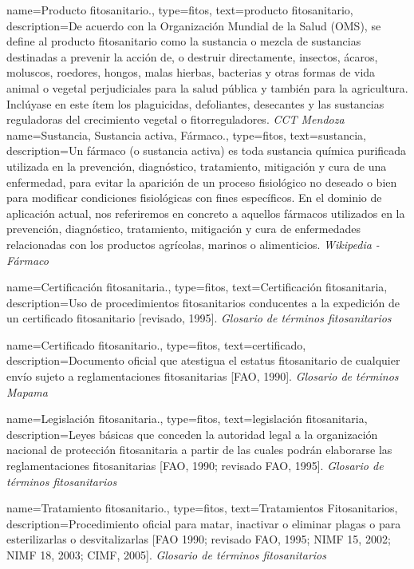 {
    name={Producto fitosanitario.},
  	type=fitos,
    text={producto fitosanitario},
    description={De acuerdo con la Organización Mundial de la Salud (OMS), se define al producto fitosanitario como la \gls{sustancia} o mezcla de sustancias destinadas a prevenir la acción de, o destruir directamente, insectos, ácaros, moluscos, roedores, hongos, malas hierbas, bacterias y otras formas de vida animal o vegetal perjudiciales para la salud pública y también para la agricultura. Inclúyase en este ítem los plaguicidas, defoliantes, desecantes y las sustancias reguladoras del crecimiento vegetal o fitorreguladores. \textit{CCT Mendoza} \cite{cricyt}}
}
{
    name={Sustancia, Sustancia activa, Fármaco.},
  	type=fitos,
    text={sustancia},
    description={Un fármaco (o sustancia activa) es toda sustancia química purificada utilizada en la prevención, diagnóstico, tratamiento, mitigación y cura de una enfermedad, para evitar la aparición de un proceso fisiológico no deseado o bien para modificar condiciones fisiológicas con fines específicos. En el dominio de aplicación actual, nos referiremos en concreto a aquellos fármacos utilizados en la prevención, diagnóstico, tratamiento, mitigación y cura de enfermedades relacionadas con los productos agrícolas, marinos o alimenticios. \textit{Wikipedia - Fármaco} \cite{farmacowiki}}
}

{
    name={Certificación fitosanitaria.},
  	type=fitos,
    text={Certificación fitosanitaria},
    description={Uso de procedimientos fitosanitarios conducentes a la expedición de un certificado fitosanitario [revisado, 1995]. \textit{Glosario de términos fitosanitarios} \cite{glosarioterminosfito}}
}

{
    name={Certificado fitosanitario.},
  	type=fitos,
    text={certificado},
    description={Documento oficial que atestigua el estatus fitosanitario de cualquier envío sujeto a reglamentaciones fitosanitarias [FAO, 1990]. \textit{Glosario de términos Mapama} \cite{glosarioterminosmapama}}
}

{
    name={Legislación fitosanitaria.},
  	type=fitos,
    text={legislación fitosanitaria},
    description={Leyes básicas que conceden la autoridad legal a la organización nacional de protección fitosanitaria a partir de las cuales podrán elaborarse las reglamentaciones fitosanitarias [FAO, 1990; revisado FAO, 1995]. \textit{Glosario de términos fitosanitarios} \cite{glosarioterminosfito}}
}

{
    name={Tratamiento fitosanitario.},
  	type=fitos,
    text={Tratamientos Fitosanitarios},
    description={Procedimiento oficial para matar, inactivar o eliminar plagas o para esterilizarlas o desvitalizarlas [FAO 1990; revisado FAO, 1995; NIMF 15, 2002; NIMF 18, 2003; CIMF, 2005]. \textit{Glosario de términos fitosanitarios} \cite{glosarioterminosfito}}
}
